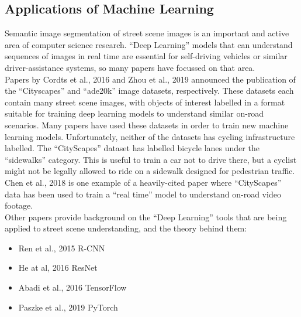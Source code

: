 \documentclass{article}
\begin{document}
\subsection{Applications of Machine Learning}

Semantic image segmentation of street scene images is an important and active area of computer science research.  ``Deep Learning'' models that can understand sequences of images in real time are essential for self-driving vehicles or similar driver-assistance systems, so many papers have focussed on that area.
\\

Papers by Cordts et al., 2016 \cite{Cordts_2016_CVPR} and Zhou et al., 2019 \cite{ade20k} announced the publication of the ``Cityscapes'' and ``ade20k'' image datasets, respectively.  These datasets each contain many street scene images, with objects of interest labelled in a format suitable for training deep learning models to understand similar on-road scenarios.  Many papers have used these datasets in order to train new machine learning models.  Unfortunately, neither of the datasets has cycling infrastructure labelled.  The ``CityScapes'' dataset has labelled bicycle lanes under the ``sidewalks'' category.  This is useful to train a car not to drive there, but a cyclist might not be legally allowed to ride on a sidewalk designed for pedestrian traffic.
\\

Chen et al., 2018 \cite{DEEPLAB} is one example of a heavily-cited paper where ``CityScapes'' data has been used to train a ``real time'' model to understand on-road video footage.
\\

Other papers provide background on the ``Deep Learning'' tools that are being applied to street scene understanding, and the theory behind them:
\begin{itemize}
\item{Ren et al., 2015 \cite{REN2016} R-CNN}
\item{He at al, 2016 \cite{He_2016_CVPR} ResNet}	
\item{Abadi et al., 2016 \cite{TENSORFLOW2016A} \cite{TENSORFLOW2016B} TensorFlow}
\item{Paszke et al., 2019 \cite{passing_space} PyTorch}
\end{itemize}
\end{document}
